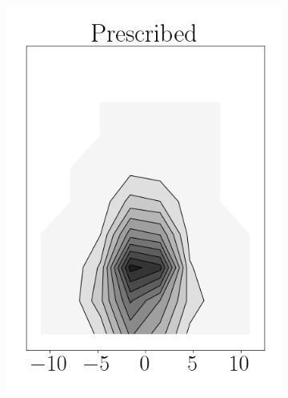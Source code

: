 \begin{figure}[h!]
\begin{subfigure}[b]{0.2\textwidth}
   \includegraphics[scale=0.4]{./part2_developments/figures_ch6_lagrangian_JICF/params_gaseous_initial_conditions/maps/prescribed_flux}
\end{subfigure}
\hspace*{0.00in}
\begin{subfigure}[b]{0.2\textwidth}
	\flushleft

\end{subfigure}
\end{figure}
